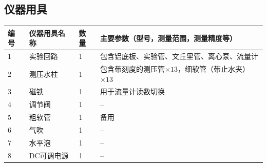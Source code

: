 \documentclass[dvipsnames, svgnames,a4paper,11pt]{article}
\begin{document}
	\subsection{仪器用具}
	\begin{table}[htbp]
		\centering
		\renewcommand\arraystretch{1.6}
		\begin{tabular}{p{}|p{}|p{}|p{}}
			\hline
			编号& 仪器用具名称 & 数量 &  主要参数（型号，测量范围，测量精度等） \\
			\hline
			1& 实验回路 & 1 & 包含铝底板、实验管、文丘里管、离心泵、流量计 \\
			
			2& 测压水柱 & 1 & 包含带刻度的测压管$\times13$，细软管（带止水夹）$\times13$ \\
			
			3& 磁铁 & 1 & 用于流量计读数切换 \\
			
			4& 调节阀 & 1 & -- \\
			
			5& 粗软管 & 1 & 备用 \\
			
			6& 气吹 & 1 & -- \\
			
			7& 水平泡 & 1 & -- \\
			
			8& DC可调电源 & 1 & -- \\
			\hline
		\end{tabular}
	\end{table}
	
	
	
\end{document}

